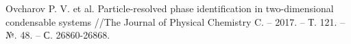 \documentclass[pdf,hyperref={unicode}]{beamer}
\begin{document}
\begin{frame}
\begin{columns}
\begin{column}{0.4\linewidth}
\begin{figure}[h]
\end{figure}

\end{column}

\end{columns}

\vspace{15mm}
\tiny{
Ovcharov P. V. et al. Particle-resolved phase identification in two-dimensional condensable systems //The Journal of Physical Chemistry C. – 2017. – Т. 121. – №. 48. – С. 26860-26868.
}
\end{frame}
\end{document}
